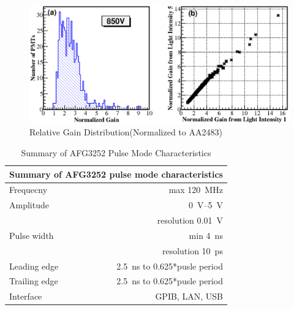 \documentclass[5p, times]{elsarticle}
\begin{document}
\begin{figure}
 \centering
 \includegraphics[width=140mm]{GainDist_Correlation}
\caption{Relative Gain Distribution(Normalized to AA2483)}
\label{fig:gain_dist}
\end{figure}

\begin{table}[h!]
\caption{Summary of AFG3252 Pulse Mode Characteristics}
\label{tab:afg3252}
 \begin{center}
 \begin{tabular}{lr}
 \multicolumn{2}{l}{Summary of AFG3252 pulse mode characteristics}\\ \hline
 Frequecny & max \SI{120}{\MHz} \\
 Amplitude & \SIrange{0}{5}{\volt} \\
           & resolution \SI{0.01}{\volt} \\
 Pulse width & min \SI{4}{\nano\second} \\
             & resolution \SI{10}{\pico\second} \\
 Leading edge & \SI{2.5}{\nano\second} to 0.625*pusle period \\
 Trailing edge & \SI{2.5}{\nano\second} to 0.625*pusle period \\
 Interface     & GPIB, LAN, USB
 \end{tabular}
 \end{center}
\end{table} 

\end{document}
